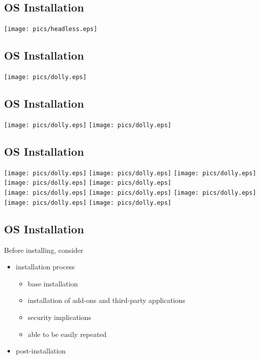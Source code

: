 \documentclass[xga]{xdvislides}
\begin{document}
\subsection{OS Installation}
\begin{center}
	\texttt{[image: pics/headless.eps]}
\end{center}

\subsection{OS Installation}
\vspace*{\fill}
\begin{center}
	\texttt{[image: pics/dolly.eps]}
\end{center}
\vspace*{\fill}

\subsection{OS Installation}
\vspace*{\fill}
\begin{center}
	\texttt{[image: pics/dolly.eps]}
	\texttt{[image: pics/dolly.eps]}
\end{center}
\vspace*{\fill}

\subsection{OS Installation}
\vspace*{\fill}
\begin{center}
	\texttt{[image: pics/dolly.eps]}
	\texttt{[image: pics/dolly.eps]}
	\texttt{[image: pics/dolly.eps]}
	\texttt{[image: pics/dolly.eps]}
	\texttt{[image: pics/dolly.eps]} \\
	\texttt{[image: pics/dolly.eps]}
	\texttt{[image: pics/dolly.eps]}
	\texttt{[image: pics/dolly.eps]}
	\texttt{[image: pics/dolly.eps]}
	\texttt{[image: pics/dolly.eps]}
\end{center}
\vspace*{\fill}

\subsection{OS Installation}
Before installing, consider
\begin{itemize}
	\item installation process
		\begin{itemize}
			\item base installation
			\item installation of add-ons and third-party applications
			\item security implications
			\item able to be easily repeated
		\end{itemize}
	\item post-installation
\end{itemize}
\end{document}
